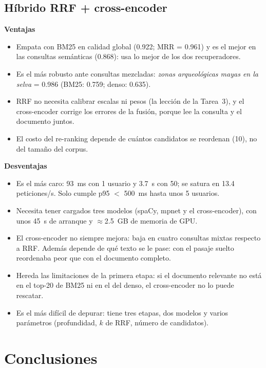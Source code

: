 \documentclass[11pt,letterpaper]{article}
\begin{document}
\subsection*{Híbrido RRF + cross-encoder}
\textbf{Ventajas}
\begin{itemize}[nosep]
\item Empata con BM25 en calidad global (0.922; MRR = 0.961) y es el mejor en las consultas semánticas (0.868): usa lo mejor de los dos recuperadores.
\item Es el más robusto ante consultas mezcladas: \emph{zonas arqueológicas mayas en la selva} = 0.986 (BM25: 0.759; denso: 0.635).
\item RRF no necesita calibrar escalas ni pesos (la lección de la Tarea~3), y el cross-encoder corrige los errores de la fusión, porque lee la consulta y el documento juntos.
\item El costo del re-ranking depende de cuántos candidatos se reordenan (10), no del tamaño del corpus.
\end{itemize}
\textbf{Desventajas}
\begin{itemize}[nosep]
\item Es el más caro: 93~ms con 1 usuario y 3.7~s con 50; se satura en 13.4 peticiones/s. Solo cumple p95 $<$ 500~ms hasta unos 5 usuarios.
\item Necesita tener cargados tres modelos (spaCy, mpnet y el cross-encoder), con unos 45~s de arranque y $\approx$2.5~GB de memoria de GPU.
\item El cross-encoder no siempre mejora: baja en cuatro consultas mixtas respecto a RRF. Además depende de qué texto se le pase: con el pasaje suelto reordenaba peor que con el documento completo.
\item Hereda las limitaciones de la primera etapa: si el documento relevante no está en el top-20 de BM25 ni en el del denso, el cross-encoder no lo puede rescatar.
\item Es el más difícil de depurar: tiene tres etapas, dos modelos y varios parámetros (profundidad, $k$ de RRF, número de candidatos).
\end{itemize}

\section{Conclusiones}
\end{document}
